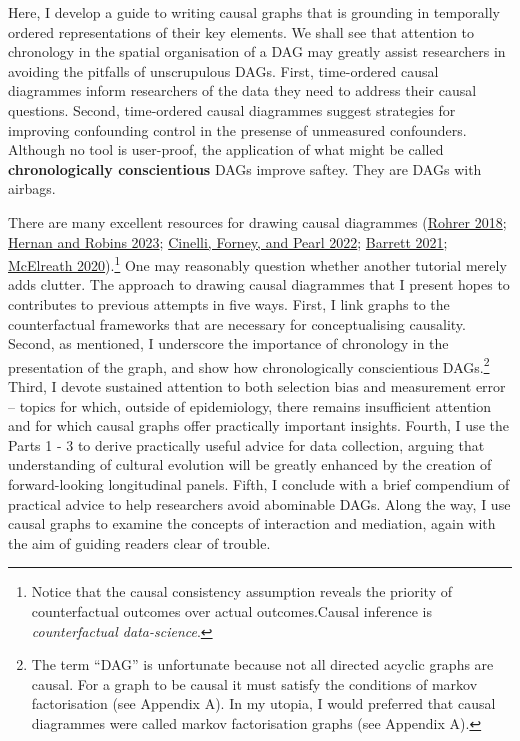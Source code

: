 \documentclass[
  singlecolumn]{report}
\begin{document}
Here, I develop a guide to writing causal graphs that is grounding in
temporally ordered representations of their key elements. We shall see
that attention to chronology in the spatial organisation of a DAG may
greatly assist researchers in avoiding the pitfalls of unscrupulous
DAGs. First, time-ordered causal diagrammes inform researchers of the
data they need to address their causal questions. Second, time-ordered
causal diagrammes suggest strategies for improving confounding control
in the presense of unmeasured confounders. Although no tool is
user-proof, the application of what might be called
\textbf{chronologically conscientious} DAGs improve saftey. They are
DAGs with airbags.

There are many excellent resources for drawing causal diagrammes
(\protect\hyperlink{ref-rohrer2018}{Rohrer 2018};
\protect\hyperlink{ref-hernan2023}{Hernan and Robins 2023};
\protect\hyperlink{ref-cinelli2022}{Cinelli, Forney, and Pearl 2022};
\protect\hyperlink{ref-barrett2021}{Barrett 2021};
\protect\hyperlink{ref-mcelreath2020}{McElreath 2020}).\footnote{Notice
  that the causal consistency assumption reveals the priority of
  counterfactual outcomes over actual outcomes.Causal inference is
  \emph{counterfactual data-science}.} One may reasonably question
whether another tutorial merely adds clutter. The approach to drawing
causal diagrammes that I present hopes to contributes to previous
attempts in five ways. First, I link graphs to the counterfactual
frameworks that are necessary for conceptualising causality. Second, as
mentioned, I underscore the importance of chronology in the presentation
of the graph, and show how chronologically conscientious
DAGs.\footnote{The term ``DAG'' is unfortunate because not all directed
  acyclic graphs are causal. For a graph to be causal it must satisfy
  the conditions of markov factorisation (see Appendix A). In my utopia,
  I would preferred that causal diagrammes were called markov
  factorisation graphs (see Appendix A).} Third, I devote sustained
attention to both selection bias and measurement error -- topics for
which, outside of epidemiology, there remains insufficient attention and
for which causal graphs offer practically important insights. Fourth, I
use the Parts 1 - 3 to derive practically useful advice for data
collection, arguing that understanding of cultural evolution will be
greatly enhanced by the creation of forward-looking longitudinal panels.
Fifth, I conclude with a brief compendium of practical advice to help
researchers avoid abominable DAGs. Along the way, I use causal graphs to
examine the concepts of interaction and mediation, again with the aim of
guiding readers clear of trouble.
\end{document}

